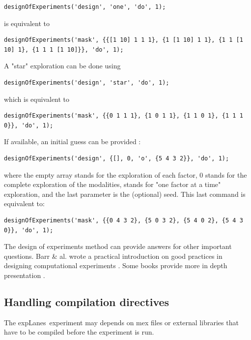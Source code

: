 \documentclass[a4paper,fleqn]{tufte-handout}
\newcommand{\explanes}{\textsf{expLanes}\ }
\begin{document}
\begin{lstlisting}
designOfExperiments('design', 'one', 'do', 1);
\end{lstlisting}

is equivalent to

\begin{lstlisting}
designOfExperiments('mask', {{[1 10] 1 1 1}, {1 [1 10] 1 1}, {1 1 [1 10] 1}, {1 1 1 [1 10]}}, 'do', 1);
\end{lstlisting}

A "star" exploration can be done using

\begin{lstlisting}
designOfExperiments('design', 'star', 'do', 1);
\end{lstlisting}

which is equivalent to

\begin{lstlisting}
designOfExperiments('mask', {{0 1 1 1}, {1 0 1 1}, {1 1 0 1}, {1 1 1 0}}, 'do', 1);
\end{lstlisting}

If available, an initial guess can be provided :

\begin{lstlisting}
designOfExperiments('design', {[], 0, 'o', {5 4 3 2}}, 'do', 1);
\end{lstlisting}
where the empty array stands for the exploration of each factor, 0 stands for the complete exploration of the modalities,  stands for "one factor at a time" exploration, and the last parameter is the (optional) seed. This last command is equivalent to:

\begin{lstlisting}
designOfExperiments('mask', {{0 4 3 2}, {5 0 3 2}, {5 4 0 2}, {5 4 3 0}}, 'do', 1);
\end{lstlisting}

The design of experiments method can provide answers for other important questions. Barr \& al.  wrote a practical introduction on good practices in designing computational experiments \cite{design}. Some books provide more in depth presentation \cite{de,se}.

\subsection{Handling compilation directives}

The \explanes experiment may depends on mex files or external libraries that have to be compiled before the experiment is run.
\end{document}
